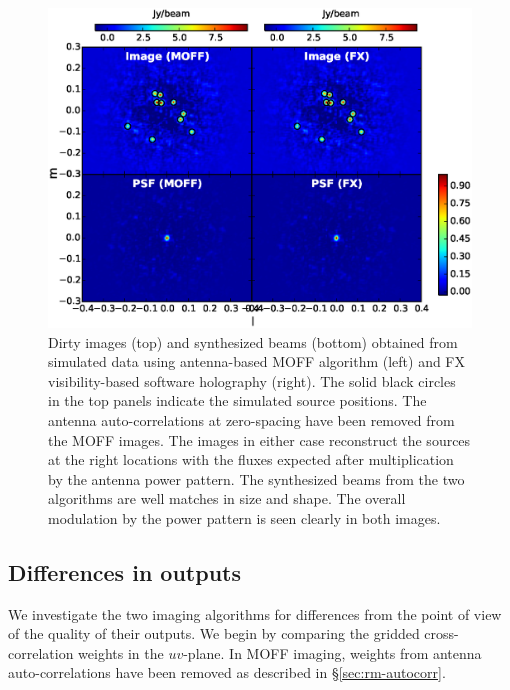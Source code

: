 \documentclass[a4paper,fleqn,usenatbib]{../mnras}
\begin{document}
\begin{figure}
  \includegraphics[width=\columnwidth]{MOFF_FX_image_comparison.eps}
  \caption{Dirty images (top) and synthesized beams (bottom) obtained from 
    simulated data using antenna-based MOFF algorithm (left) and FX 
    visibility-based software holography (right). The solid black circles in the
    top panels indicate the simulated source positions. The antenna 
    auto-correlations at zero-spacing have been removed from the MOFF images. 
    The images in either case reconstruct the sources at the right locations 
    with the fluxes expected after multiplication by the antenna power pattern. 
    The synthesized beams from the two algorithms are well matches in size and
    shape. The overall modulation by the power pattern is seen clearly in both
    images.}
  \label{fig:MOFF-FX-image}
\end{figure}

\subsection{Differences in outputs}\label{sec:diff}

We investigate the two imaging algorithms for differences from the point of 
view of the quality of their outputs. We begin by comparing the gridded 
cross-correlation weights in the $uv$-plane. In MOFF imaging, weights 
from antenna auto-correlations have been removed as described in 
\S\ref{sec:rm-autocorr}. 
\end{document}
